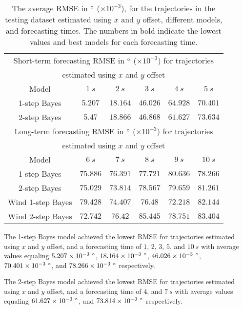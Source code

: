 \documentclass[preprint,12pt]{elsarticle}
\begin{document}
\begin{table}[!ht]
	\centering
	\begin{tabular}{|c|c|c|c|c|c|}
		\hline
		\multicolumn{6}{|c|}{Short-term forecasting RMSE in $\degree$ ($\times 10^{-3}$) for trajectories} \\ 
		\multicolumn{6}{|c|}{estimated using $x$ and $y$ offset} \\ \hline
		Model & $1 \ s$ & $2 \ s$ & $3 \ s$ & $4 \ s$ & $5 \ s$ \\ \hline
		1-step Bayes & $\mathbf{5.207}$ & $\mathbf{18.164}$ & $\mathbf{46.026}$ & $64.928$ & $\mathbf{70.401}$ \\ \hline
		2-step Bayes & $5.47$ & $18.866$ & $46.868$ & $\mathbf{61.627}$ & $73.634$ \\ \hline
		\multicolumn{6}{|c|}{Long-term forecasting RMSE in $\degree$ ($\times 10^{-3}$) for trajectories} \\ 
		\multicolumn{6}{|c|}{estimated using $x$ and $y$ offset} \\ \hline
		Model & $6 \ s$ & $7 \ s$ & $8 \ s$ & $9 \ s$ & $10 \ s$ \\ \hline
		1-step Bayes & $75.886$ & $76.391$ & $77.721$ & $80.636$ & $\mathbf{78.266}$ \\ \hline
		2-step Bayes & $75.029$ & $\mathbf{73.814}$ & $78.567$ & $79.659$ & $81.261$ \\ \hline
		Wind 1-step Bayes & $79.428$ & $74.407$ & $\mathbf{76.48}$ & $\mathbf{72.218}$ & $82.144$ \\ \hline
		Wind 2-step Bayes & $\mathbf{72.742}$ & $76.42$ & $85.445$ & $78.751$ & $83.404$ \\ \hline
	\end{tabular}
	\caption{The average RMSE in $\degree$ ($\times 10^{-3}$), for the trajectories in the testing dataset estimated using $x$ and $y$ offset, different models, and forecasting times. The numbers in bold indicate the lowest values and best models for each forecasting time.}
	\label{tab:best_no_abs_RMSE}
\end{table}

The 1-step Bayes model achieved the lowest RMSE for trajectories estimated using $x$ and $y$ offset, and a forecasting time of $1$, $2$, $3$, $5$, and $10 \ s$ with average values equaling $5.207 \times 10^{-3} \ \degree$, $18.164 \times 10^{-3} \ \degree$, $46.026 \times 10^{-3} \ \degree$, $70.401 \times 10^{-3} \ \degree$, and $78.266 \times 10^{-3} \ \degree$ respectively.

The 2-step Bayes model achieved the lowest RMSE for trajectories estimated using $x$ and $y$ offset, and a forecasting time of $4$, and $7 \ s$ with average values equaling $61.627 \times 10^{-3} \ \degree$, and $73.814 \times 10^{-3} \ \degree$ respectively.
\end{document}
